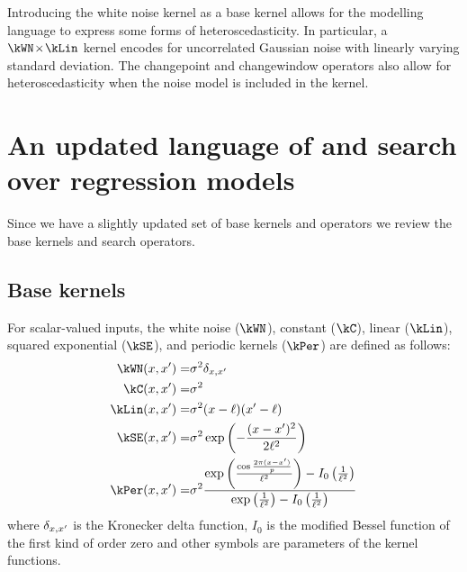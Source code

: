 Introducing the white noise kernel as a base kernel allows for the modelling language to express some forms of heteroscedasticity.
In particular, a $\kWN \kerntimes \kLin$ kernel encodes for uncorrelated Gaussian noise with linearly varying standard deviation.
The changepoint and changewindow operators also allow for heteroscedasticity when the noise model is included in the kernel.

\section{An updated language of  and search over regression models}
\label{sec:description:language}


Since we have a slightly updated set of base kernels and operators we review the base kernels and search operators.

\subsection{Base kernels}
\label{sec:description:base}

For scalar-valued inputs, the white noise ($\kWN$), constant ($\kC$), linear ($\kLin$), squared exponential ($\kSE$), and periodic kernels ($\kPer$) are defined as follows:
\begin{eqnarray}
\kWN(\inputVar, \inputVar') =& \sigma^2\delta_{\inputVar, \inputVar'} \\
\kC(\inputVar, \inputVar') =& \sigma^2 \\
\kLin(\inputVar, \inputVar') =& \sigma^2(\inputVar - \ell)(\inputVar' - \ell) \\
\kSE(\inputVar, \inputVar') =& \sigma^2\exp\left(-\frac{(\inputVar - \inputVar')^2}{2\ell^2}\right) \\
\kPer(\inputVar, \inputVar') =&  \sigma^2\frac{\exp\left(\frac{\cos\frac{2 \pi (\inputVar - \inputVar')}{p}}{\ell^2}\right) - I_0\left(\frac{1}{\ell^2}\right)}{\exp\left(\frac{1}{\ell^2}\right) - I_0\left(\frac{1}{\ell^2}\right)}
\end{eqnarray}
where $\delta_{x, x'}$ is the Kronecker delta function, $I_0$ is the modified Bessel function of the first kind of order zero and other symbols are parameters of the kernel functions.


